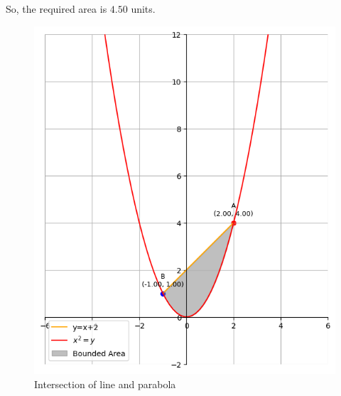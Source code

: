 \documentclass[journal]{IEEEtran}
\begin{document}
{So, the required area is $4.50$ units.
   \begin{figure}[!ht]
    \centering
	\includegraphics[width=1\textwidth]{plots/plot.png}
    \caption{Intersection of line and parabola}
    \label{fig:plot}
\end{figure}  

}
\end{document}

